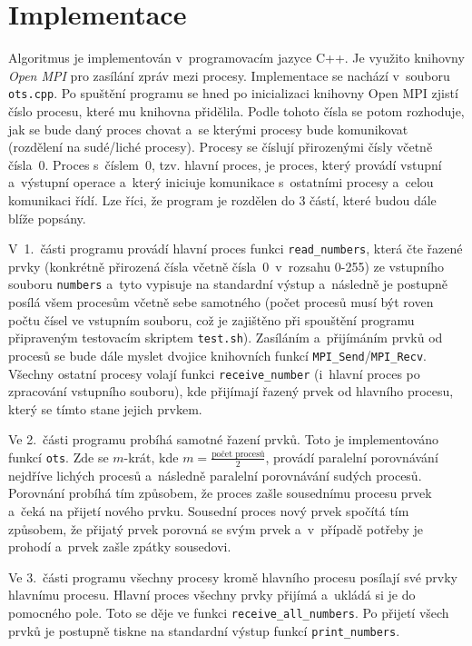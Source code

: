 \documentclass[a4paper, 10pt, twocolumn]{article}
\begin{document}
    \section{Implementace}

    Algoritmus je implementován v~programovacím jazyce C++. Je využito
    knihovny \emph{Open MPI} pro zasílání zpráv mezi procesy. Implementace
    se nachází v~souboru \texttt{ots.cpp}. Po spuštění programu se hned
    po inicializaci knihovny Open MPI zjistí číslo procesu, které mu
    knihovna přidělila. Podle tohoto čísla se potom rozhoduje, jak se
    bude daný proces chovat a~se kterými procesy bude komunikovat
    (rozdělení na sudé/liché procesy). Procesy se číslují přirozenými čísly
    včetně čísla~0. Proces s~číslem~0, tzv. hlavní proces, je proces, který
    provádí vstupní a~výstupní operace a~který iniciuje komunikace
    s~ostatními procesy a~celou komunikaci řídí. Lze říci, že program je
    rozdělen do 3 částí, které budou dále blíže popsány.

    V~1.~části programu provádí hlavní proces funkci \texttt{read\_numbers},
    která čte řazené prvky (konkrétně přirozená čísla včetně
    čísla~0~v~rozsahu 0-255) ze vstupního souboru \texttt{numbers} a~tyto
    vypisuje na standardní výstup a~následně je postupně posílá všem procesům
    včetně sebe samotného (počet procesů musí být roven počtu čísel ve
    vstupním souboru, což je zajištěno při spouštění programu připraveným
    testovacím skriptem \texttt{test.sh}). Zasíláním a~přijímáním prvků
    od procesů se bude dále myslet dvojice knihovních funkcí
    \texttt{MPI\_Send}/\texttt{MPI\_Recv}. Všechny ostatní procesy volají
    funkci \texttt{receive\_number} (i~hlavní proces po zpracování vstupního
    souboru), kde přijímají řazený prvek od hlavního procesu, který se tímto
    stane jejich prvkem.

    Ve 2.~části programu probíhá samotné řazení prvků. Toto je implementováno
    funkcí \texttt{ots}. Zde se $ m $-krát, kde $ m =
    \frac{\text{počet procesů}}{2} $, provádí paralelní porovnávání nejdříve
    lichých procesů a~následně paralelní porovnávání sudých procesů.
    Porovnání probíhá tím způsobem, že proces zašle sousednímu procesu
    prvek a~čeká na přijetí nového prvku. Sousední proces nový prvek
    spočítá tím způsobem, že přijatý prvek porovná se svým prvek a~v~případě
    potřeby je prohodí a~prvek zašle zpátky sousedovi.

    Ve 3.~části programu všechny procesy kromě hlavního procesu posílají
    své prvky hlavnímu procesu. Hlavní proces všechny prvky přijímá
    a~ukládá si je do pomocného pole. Toto se děje ve funkci
    \texttt{receive\_all\_numbers}. Po přijetí všech prvků je postupně
    tiskne na standardní výstup funkcí \texttt{print\_numbers}.
\end{document}
